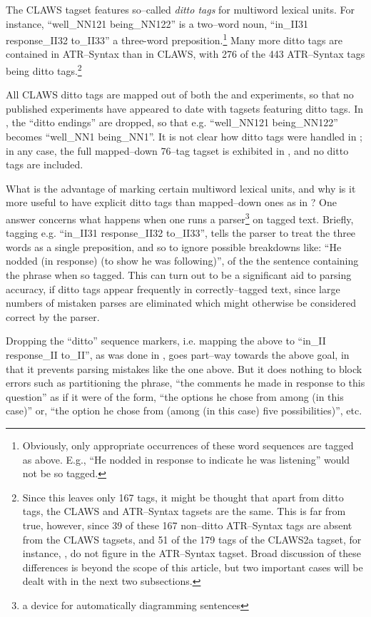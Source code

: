 The CLAWS tagset features so--called {\em ditto tags} for multiword
lexical units. For instance, ``well\_NN121 being\_NN122'' is a two--word
noun, ``in\_II31 response\_II32 to\_II33'' a three-word
preposition.\footnote{Obviously, only appropriate occurrences of these
word sequences are tagged as above.  E.g., ``He nodded in response to
indicate he was listening'' would not be so tagged.} Many more ditto
tags are contained in ATR--Syntax than in CLAWS, with 276 of the 443
ATR--Syntax tags being ditto tags.\footnote{Since this leaves only 167
tags, it might be thought that apart from ditto tags, the CLAWS and
ATR--Syntax tagsets are the same. This is far from true, however,
since 39 of these 167 non--ditto ATR--Syntax tags are absent from the
CLAWS tagsets, and 51 of the 179 tags of the CLAWS2a tagset, for
instance, \cite{Eyes+Leech:EL}, do not figure in the ATR--Syntax
tagset. Broad discussion of these differences is beyond the scope of
this article, but two important cases will be dealt with in the next
two subsections.}


All CLAWS ditto tags are mapped out of both the
\cite{Merialdo:tagging} and
\cite{Black+al:tag} experiments, so that no published experiments have appeared to date
with tagsets featuring ditto tags. In \cite{Black+al:tag}, the ``ditto
endings'' are dropped, so that e.g. ``well\_NN121 being\_NN122'' becomes
``well\_NN1 being\_NN1''. It is not clear how ditto tags were handled in
\cite{Merialdo:tagging}; in any case, the full mapped--down
76--tag tagset is exhibited in \cite{Merialdo:tagging}, and no ditto
tags are included.

What is the advantage of marking certain multiword lexical units, and
why is it more useful to have explicit ditto tags than mapped--down
ones as in \cite{Black+al:tag}? One answer concerns what happens when
one runs a parser\footnote{a device for automatically diagramming
sentences} on tagged text. Briefly, tagging e.g. ``in\_II31
response\_II32 to\_II33'', tells the parser to treat the three words as
a single preposition, and so to ignore possible breakdowns like: ``He
nodded (in response) (to show he was following)'', of the the
sentence containing the phrase when so tagged. This can turn out to be
a significant aid to parsing accuracy, if ditto tags appear frequently
in correctly--tagged text, since large numbers of mistaken parses are
eliminated which might otherwise be considered correct by the parser.

Dropping the ``ditto'' sequence markers, i.e. mapping the above 
to ``in\_II response\_II to\_II'', as was done in \cite{Black+al:tag},
goes part--way towards the above goal, in that it prevents
parsing mistakes like the one above. But it does nothing to block
errors such as partitioning the phrase, ``the comments he made
in response to this question'' as if it were of the form, ``the
options he chose from among (in this case)'' or, ``the
option he chose from (among (in this case) five possibilities)'', etc.

